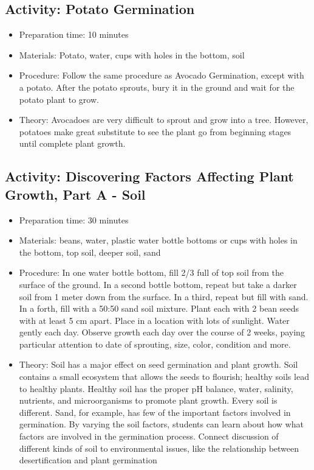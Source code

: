 \subsection{Activity: Potato Germination}
\begin{itemize}
\item{Preparation time: 10 minutes}
\item{Materials: Potato, water, cups with holes in the bottom, soil}
\item{Procedure: Follow the same procedure as Avocado Germination, except with a potato. After the potato sprouts, bury it in the ground and wait for the potato plant to grow.}
\item{Theory: Avocadoes are very difficult to sprout and grow into a tree. However, potatoes make great substitute to see the plant go from beginning stages until complete plant growth.}
\end{itemize}

\subsection{Activity: Discovering Factors Affecting Plant Growth, Part A - Soil}
\begin{itemize}
\item{Preparation time: 30 minutes}
\item{Materials: beans, water, plastic water bottle bottoms or cups with holes in the bottom, top soil, deeper soil, sand}
\item{Procedure: In one water bottle bottom, fill 2/3 full of top soil from the surface of the ground. In a second bottle bottom, repeat but take a darker soil from 1 meter down from the surface. In a third, repeat but fill with sand. In a forth, fill with a 50:50 sand soil mixture. Plant each with 2 bean seeds with at least 5 cm apart. Place in a location with lots of sunlight. Water gently each day. Observe growth each day over the course of 2 weeks, paying particular attention to date of sprouting, size, color, condition and more.}
\item{Theory: Soil has a major effect on seed germination and plant growth. Soil contains a small ecosystem that allows the seeds to flourish; healthy soils lead to healthy plants. Healthy soil has the proper pH balance, water, salinity, nutrients, and microorganisms to promote plant growth. Every soil is different. Sand, for example, has few of the important factors involved in germination. By varying the soil factors, students can learn about how what factors are involved in the germination process. Connect discussion of different kinds of soil to environmental issues, like the relationship between desertification and plant germination}
\end{itemize}

